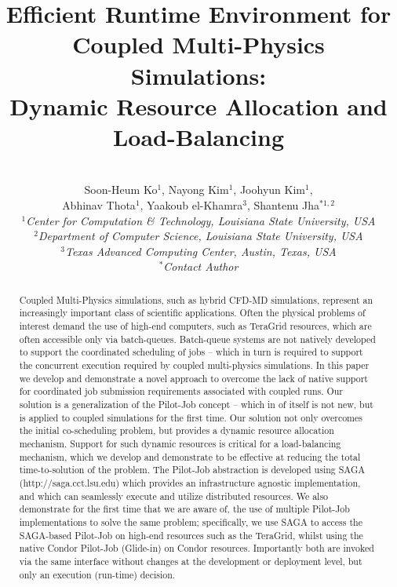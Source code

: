 \documentclass[conference,final]{IEEEtran}
\title{Efficient Runtime Environment for Coupled Multi-Physics Simulations: \\
Dynamic Resource Allocation and Load-Balancing}
\author{
 ~\\[-2em]
 Soon-Heum Ko$^{1}$, Nayong Kim$^{1}$, Joohyun Kim$^{1}$, \\ Abhinav Thota$^{1}$, Yaakoub el-Khamra$^{3}$, Shantenu Jha$^{*1,2}$\\
 \small{\emph{$^{1}$Center for Computation \& Technology, Louisiana State University, USA}}\\
 \small{\emph{$^{2}$Department of Computer Science, Louisiana State University, USA}}\\
 \small{\emph{$^{3}$Texas Advanced Computing Center, Austin, Texas, USA}}\\
 \small{\emph{$^{*}$Contact Author}}\\
}
\newcommand{\up}{\vspace*{-1em}}
\begin{document}
\maketitle

\begin{abstract}
 Coupled Multi-Physics simulations, such as hybrid CFD-MD simulations,
represent an increasingly important class of scientific applications.
Often the physical problems of interest demand the use of high-end
computers, such as TeraGrid resources, which are often accessible only
via batch-queues. Batch-queue systems are not natively developed to
support the coordinated scheduling of jobs -- which in turn is
required to support the concurrent execution required by coupled
multi-physics simulations. In this paper we develop and demonstrate a
novel approach to overcome the lack of native support for coordinated
job submission requirements associated with coupled runs. Our solution
is a generalization of the Pilot-Job concept -- which in of itself is
not new, but is applied to coupled simulations for the first time. Our
solution not only overcomes the initial co-scheduling problem, but
provides a dynamic resource allocation mechanism. Support for such
dynamic resources is critical for a load-balancing mechanism, which we
develop and demonstrate to be effective at reducing the total
time-to-solution of the problem. The Pilot-Job abstraction is
developed using SAGA (http://saga.cct.lsu.edu) which provides an
infrastructure agnostic implementation, and which can seamlessly
execute and utilize distributed resources. We also demonstrate for the
first time that we are aware of, the use of multiple Pilot-Job
implementations to solve the same problem; specifically, we use SAGA
to access the SAGA-based Pilot-Job on high-end resources such as the
TeraGrid, whilst using the native Condor Pilot-Job (Glide-in) on
Condor resources. Importantly both are invoked via the same interface
without changes at the development or deployment level, but only an
execution (run-time) decision.

\end{abstract}
\up\up
\end{document}
